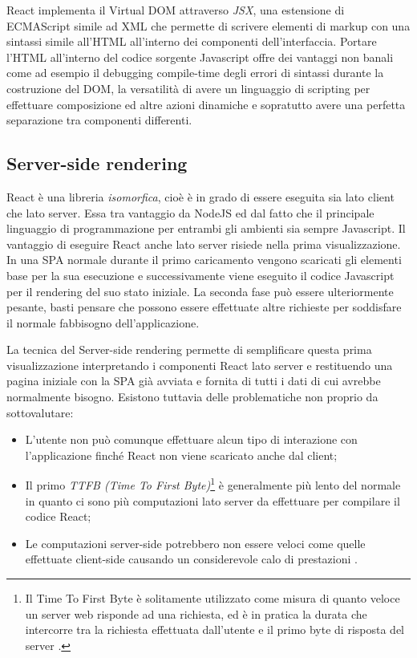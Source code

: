 React implementa il Virtual DOM attraverso \textit{JSX}, una estensione di ECMAScript simile ad XML che permette di scrivere elementi di markup con una sintassi simile all'HTML all'interno dei componenti dell'interfaccia. Portare l'HTML all'interno del codice sorgente Javascript offre dei vantaggi non banali come ad esempio il debugging compile-time degli errori di sintassi durante la costruzione del DOM, la versatilità di avere un linguaggio di scripting per effettuare composizione ed altre azioni dinamiche e sopratutto avere una perfetta separazione tra componenti differenti.

\subsection{Server-side rendering}
React è una libreria \textit{isomorfica}, cioè è in grado di essere eseguita sia lato client che lato server. Essa tra vantaggio da NodeJS ed dal fatto che il principale linguaggio di programmazione per entrambi gli ambienti sia sempre Javascript.
Il vantaggio di eseguire React anche lato server risiede nella prima visualizzazione. In una SPA normale durante il primo caricamento vengono scaricati gli elementi base per la sua esecuzione e successivamente viene eseguito il codice Javascript per il rendering del suo stato iniziale. La seconda fase può essere ulteriormente pesante, basti pensare che possono essere effettuate altre richieste per soddisfare il normale fabbisogno dell'applicazione.

La tecnica del Server-side rendering permette di semplificare questa prima visualizzazione interpretando i componenti React lato server e restituendo una pagina iniziale con la SPA già avviata e fornita di tutti i dati di cui avrebbe normalmente bisogno. Esistono tuttavia delle problematiche non proprio da sottovalutare: 

\begin{itemize}
    \item L'utente non può comunque effettuare alcun tipo di interazione con l'applicazione finché React non viene scaricato anche dal client;
    \item Il primo \textit{TTFB (Time To First Byte)}\footnote{Il Time To First Byte è solitamente utilizzato come misura di quanto veloce un server web risponde ad una richiesta, ed è in pratica la durata che intercorre tra la richiesta effettuata dall'utente e il primo byte di risposta del server \cite{GrahamOnTTFB}.} è generalmente più lento del normale in quanto ci sono più computazioni lato server da effettuare per compilare il codice React;
    \item Le computazioni server-side potrebbero non essere veloci come quelle effettuate client-side causando un considerevole calo di prestazioni \cite{GrigoryanOnServerSideRendering}.
\end{itemize}